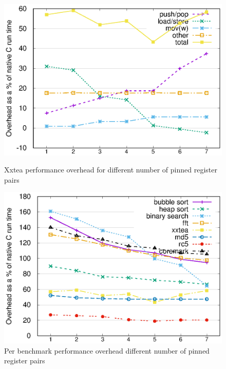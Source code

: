 \begin{figure}
 \centering
 \begin{minipage}{0.45\textwidth}
  \centering
  \includegraphics[width=\myfiguresizexxtea]{performance-pinnedregs-xxtea-per-opcode-category.eps}
  \caption{Xxtea performance overhead for different number of pinned register pairs}
  \label{fig-performance-pinnedregs-xxtea-per-opcode-category}
 \end{minipage}\hfill
 \begin{minipage}{0.45\textwidth}
  \centering
  \includegraphics[width=\myfiguresizexxtea]{performance-pinnedregs-per-benchmark.eps}
  \caption{Per benchmark performance overhead different number of pinned register pairs}
  \label{fig-performance-pinnedregs-per-benchmark}
 \end{minipage}
\end{figure}

